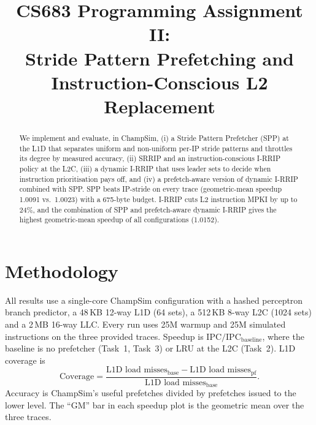 \documentclass[conference]{IEEEtran}
\begin{document}
\title{CS683 Programming Assignment II:\\
Stride Pattern Prefetching and Instruction-Conscious L2 Replacement}

\author{
\and
{}
\and
{}
\and
{}
}

\maketitle

\begin{abstract}
We implement and evaluate, in ChampSim, (i) a Stride Pattern Prefetcher (SPP)
at the L1D that separates uniform and non-uniform per-IP stride patterns and
throttles its degree by measured accuracy, (ii) SRRIP and an
instruction-conscious I-RRIP policy at the L2C, (iii) a dynamic I-RRIP that
uses leader sets to decide when instruction prioritisation pays off, and
(iv) a prefetch-aware version of dynamic I-RRIP combined with SPP. SPP beats
IP-stride on every trace (geometric-mean speedup 1.0091 vs.\ 1.0023) with a
675-byte budget. I-RRIP cuts L2 instruction MPKI by up to 24\%, and the
combination of SPP and prefetch-aware dynamic I-RRIP gives the highest
geometric-mean speedup of all configurations (1.0152).
\end{abstract}

\section{Methodology}
All results use a single-core ChampSim configuration with a hashed perceptron
branch predictor, a 48\,KB 12-way L1D (64 sets), a 512\,KB 8-way L2C
(1024 sets) and a 2\,MB 16-way LLC. Every run uses 25M warmup and 25M
simulated instructions on the three provided traces. Speedup is
$\mathrm{IPC}/\mathrm{IPC}_{\mathrm{baseline}}$, where the baseline is no
prefetcher (Task~1, Task~3) or LRU at the L2C (Task~2). L1D coverage is
\begin{equation*}
\text{Coverage} = \frac{\text{L1D load misses}_{\text{base}} - \text{L1D load misses}_{\text{pf}}}{\text{L1D load misses}_{\text{base}}}.
\end{equation*}
Accuracy is ChampSim's useful prefetches divided by prefetches issued to the
lower level. The ``GM'' bar in each speedup plot is the geometric mean over
the three traces.
\end{document}
